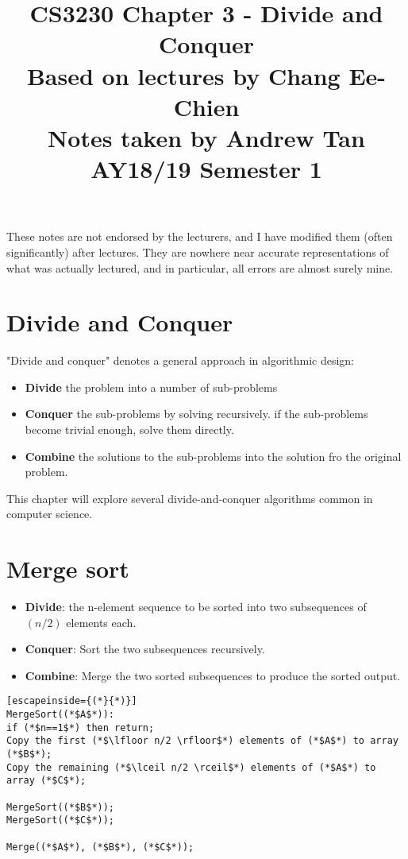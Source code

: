 \documentclass[a4paper]{article}
\title{%
	CS3230 Chapter 3 - Divide and Conquer \\
	\large Based on lectures by Chang Ee-Chien
	\\ Notes taken by Andrew Tan
	\\ AY18/19 Semester 1
	\\ }
\author{}
\date{\vspace{-5ex}}
\begin{document}
\maketitle

\begin{center}\begin{minipage}[c]{0.9\textwidth}\centering\footnotesize These notes are not endorsed by the lecturers, and I have modified them (often significantly) after lectures. They are nowhere near accurate representations of what was actually lectured, and in particular, all errors are almost surely mine.\end{minipage}\end{center}

\section {Divide and Conquer}
"Divide and conquer" denotes a general approach in algorithmic design:
\begin{itemize}
	\item[] \textbf{Divide} the problem into a number of sub-problems
	\item[] \textbf{Conquer} the sub-problems by solving recursively. if the sub-problems become trivial enough, solve them directly.
	\item[] \textbf{Combine} the solutions to the sub-problems into the solution fro the original problem.
\end{itemize}
This chapter will explore several divide-and-conquer algorithms common in computer science.

\section{Merge sort}
\begin{itemize}
	\item[] \textbf{Divide}: the n-element sequence to be sorted into two subsequences of $(n/2)$ elements each.
	\item[] \textbf{Conquer}: Sort the two subsequences recursively.
	\item[] \textbf{Combine}: Merge the two sorted subsequences to produce the sorted output.
\end{itemize}
\begin{lstlisting}[escapeinside={(*}{*)}]
MergeSort((*$A$*)):
if (*$n==1$*) then return;
Copy the first (*$\lfloor n/2 \rfloor$*) elements of (*$A$*) to array (*$B$*);
Copy the remaining (*$\lceil n/2 \rceil$*) elements of (*$A$*) to array (*$C$*);

MergeSort((*$B$*));
MergeSort((*$C$*));

Merge((*$A$*), (*$B$*), (*$C$*));
\end{lstlisting}
\end{document}

